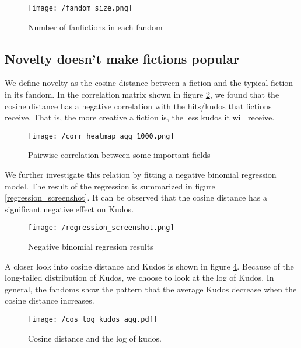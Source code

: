 \documentclass[a4paper]{article}
\begin{document}
\begin{figure}[htbp]
\begin{center}
\texttt{[image: /fandom\_size.png]}
\caption{Number of fanfictions in each fandom}
\label{fig:fandom_size}
\end{center}
\end{figure}


\label{sec:results}
\subsection{Novelty doesn't make fictions popular}
We define novelty as the cosine distance between a fiction and the typical fiction in its fandom. In the correlation matrix shown in figure \ref{fig:corr_heatmap}, we found that the cosine distance has a negative correlation with the hits/kudos that fictions receive. That is, the more creative a fiction is, the less kudos it will receive.

\begin{figure}[htbp]
\begin{center}
\texttt{[image: /corr\_heatmap\_agg\_1000.png]}
\caption{Pairwise correlation between some important fields }
\label{fig:corr_heatmap}
\end{center}
\end{figure}

We further investigate this relation by fitting a negative binomial regression model. The result of the regression is summarized in figure \ref{regression_screenshot}. It can be observed that the cosine distance has a significant negative effect on Kudos.

\begin{figure}[htbp]
\begin{center}
\texttt{[image: /regression\_screenshot.png]}
\caption{Negative binomial regresion results}
\label{fig:regression}
\end{center}
\end{figure}

A closer look into cosine distance and Kudos is shown in figure \ref{fig:cos_kudos}. Because of the long-tailed distribution of Kudos, we choose to look at the log of Kudos. In general, the fandoms show the pattern that the average Kudos decrease when the cosine distance increases.


\begin{figure}[htbp]
\begin{center}
\texttt{[image: /cos\_log\_kudos\_agg.pdf]}
\caption{Cosine distance and the log of kudos.}
\label{fig:cos_kudos}
\end{center}
\end{figure}
\end{document}
